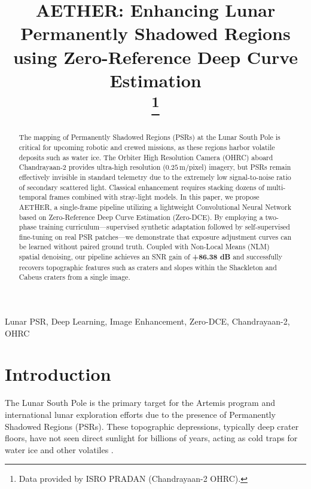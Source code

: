 \documentclass[conference]{IEEEtran}
\begin{document}
\title{AETHER: Enhancing Lunar Permanently Shadowed Regions using Zero-Reference Deep Curve Estimation\\
\thanks{Data provided by ISRO PRADAN (Chandrayaan-2 OHRC).}
}

\author{
}

\maketitle

\begin{abstract}
The mapping of Permanently Shadowed Regions (PSRs) at the Lunar South Pole is critical for upcoming robotic and crewed missions, as these regions harbor volatile deposits such as water ice. The Orbiter High Resolution Camera (OHRC) aboard Chandrayaan-2 provides ultra-high resolution ($0.25$\,m/pixel) imagery, but PSRs remain effectively invisible in standard telemetry due to the extremely low signal-to-noise ratio of secondary scattered light. Classical enhancement requires stacking dozens of multi-temporal frames combined with stray-light models. In this paper, we propose AETHER, a single-frame pipeline utilizing a lightweight Convolutional Neural Network based on Zero-Reference Deep Curve Estimation (Zero-DCE). By employing a two-phase training curriculum—supervised synthetic adaptation followed by self-supervised fine-tuning on real PSR patches—we demonstrate that exposure adjustment curves can be learned without paired ground truth. Coupled with Non-Local Means (NLM) spatial denoising, our pipeline achieves an SNR gain of \textbf{+86.38 dB} and successfully recovers topographic features such as craters and slopes within the Shackleton and Cabeus craters from a single image.
\end{abstract}

\begin{IEEEkeywords}
Lunar PSR, Deep Learning, Image Enhancement, Zero-DCE, Chandrayaan-2, OHRC
\end{IEEEkeywords}

\section{Introduction}
The Lunar South Pole is the primary target for the Artemis program and international lunar exploration efforts due to the presence of Permanently Shadowed Regions (PSRs). These topographic depressions, typically deep crater floors, have not seen direct sunlight for billions of years, acting as cold traps for water ice and other volatiles \cite{horus2021}. 
\end{document}
